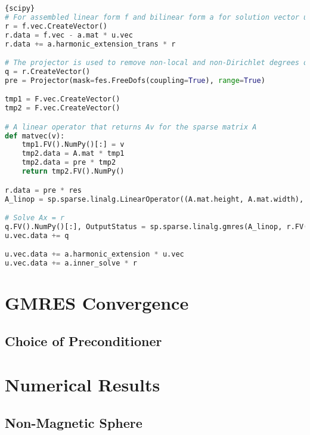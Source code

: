 \documentclass[a4paper,12]{elsarticle}
\theoremstyle{definition}
\begin{document}
\begin{lstlisting}[caption=Static condensation using SciPy,frame=tlrb, language=python]{scipy}
# For assembled linear form f and bilinear form a for solution vector u. 
r = f.vec.CreateVector()
r.data = f.vec - a.mat * u.vec
r.data += a.harmonic_extension_trans * r

# The projector is used to remove non-local and non-Dirichlet degrees of freedom that should not participate in the solve
q = r.CreateVector()
pre = Projector(mask=fes.FreeDofs(coupling=True), range=True)

tmp1 = F.vec.CreateVector()
tmp2 = F.vec.CreateVector()

# A linear operator that returns Av for the sparse matrix A
def matvec(v):
	tmp1.FV().NumPy()[:] = v
	tmp2.data = A.mat * tmp1
	tmp2.data = pre * tmp2
	return tmp2.FV().NumPy()

r.data = pre * res
A_linop = sp.sparse.linalg.LinearOperator((A.mat.height, A.mat.width), matvec)

# Solve Ax = r
q.FV().NumPy()[:], OutputStatus = sp.sparse.linalg.gmres(A_linop, r.FV().NumPy(), tol=1e-10, M=P.mat)
u.vec.data += q

u.vec.data += a.harmonic_extension * u.vec
u.vec.data += a.inner_solve * r
\end{lstlisting}

\section{GMRES Convergence}



\subsection{Choice of Preconditioner}


\section{Numerical Results}

\subsection{Non-Magnetic Sphere}



\end{document}
